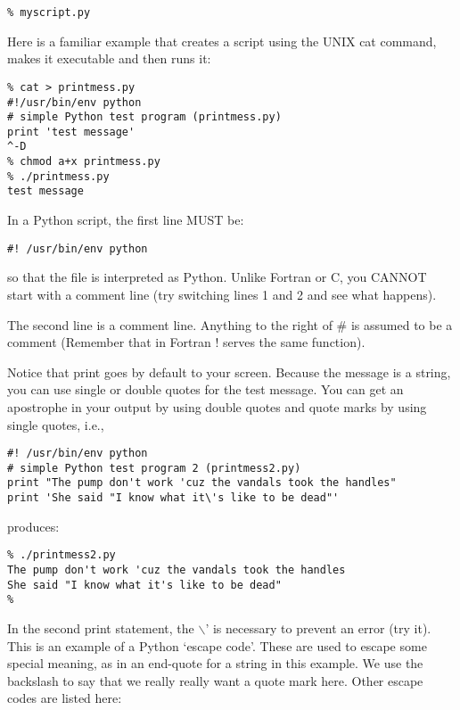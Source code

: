 {{\singlespacing \color{blue} \begin{verbatim}
% myscript.py
\end{verbatim}}

Here is a familiar example that creates a script using the UNIX cat command, makes it executable and then runs it:

{\singlespacing \color{blue} \begin{verbatim}
% cat > printmess.py
#!/usr/bin/env python
# simple Python test program (printmess.py)
print 'test message'
^-D
% chmod a+x printmess.py
% ./printmess.py
test message
\end{verbatim}}

\noindent
In a Python script, the  first line MUST be: 

{\singlespacing \color{blue} \begin{verbatim}
#! /usr/bin/env python
\end{verbatim}}

\noindent
so that the file is interpreted as Python.  Unlike Fortran or C, you CANNOT start with a
comment line (try switching lines 1 and 2 and see what happens).

The second line is a comment line.  Anything to the right of \# is assumed to be a comment
(Remember that in Fortran {\color{blue}! } serves the same function).

Notice that print goes by default to your screen.  Because the message is a string, you can use single or double quotes
for the test message.  You can get an apostrophe in your output by using double quotes
and quote marks by using single quotes, i.e.,

{\singlespacing \color{blue} \begin{verbatim}
#! /usr/bin/env python
# simple Python test program 2 (printmess2.py)
print "The pump don't work 'cuz the vandals took the handles"
print 'She said "I know what it\'s like to be dead"'
\end{verbatim}}

\noindent
produces:

{\singlespacing \color{blue} \begin{verbatim}
% ./printmess2.py
The pump don't work 'cuz the vandals took the handles
She said "I know what it's like to be dead"
%
\end{verbatim}}

\noindent
In the second print statement, the $\backslash$' is necessary to prevent an error (try it).   This is an example of a Python `escape code'.   These are used to escape some special meaning, as in an end-quote for a string in this example. We use the backslash to say that we really really want a quote mark here.   Other escape codes are listed here:  

}
